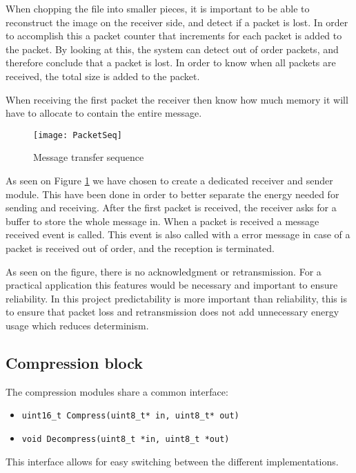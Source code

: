 When chopping the file into smaller pieces, it is important to be able to reconstruct the image on the receiver side, and detect if a packet is lost. 
In order to accomplish this a packet counter that increments for each packet is added to the packet. 
By looking at this, the system can detect out of order packets, and therefore conclude that a packet is lost. 
In order to know when all packets are received, the total size is added to the packet.

When receiving the first packet the receiver then know how much memory it will have to allocate to contain the entire message. 


\begin{figure}[H]
	\centering
	\texttt{[image: PacketSeq]}
	\caption{Message transfer sequence }
	\label{fig:PacketSeq}
\end{figure}

As seen on Figure \ref{fig:PacketSeq} we have chosen to create a dedicated receiver and sender module. 
This have been done in order to better separate the energy needed for sending and receiving. 
After the first packet is received, the receiver asks for a buffer to store the whole message in. 
When a packet is received a message received event is called. 
This event is also called with a error message in case of a packet is received out of order, and the reception is terminated. 

As seen on the figure, there is no acknowledgment or retransmission. 
For a practical application this features would be necessary and important to ensure reliability.
In this project predictability is more important than reliability, this is to ensure that packet loss and retransmission does not add unnecessary energy usage which reduces determinism.


\subsection{Compression block}
\label{sec:Compression-block}

The compression modules share a common interface: 

\begin{itemize}
    \item \texttt{uint16\_t Compress(uint8\_t* in, uint8\_t* out)}
    \item \texttt{void Decompress(uint8\_t *in, uint8\_t *out)}
\end{itemize}

This interface allows for easy switching between the different implementations.

